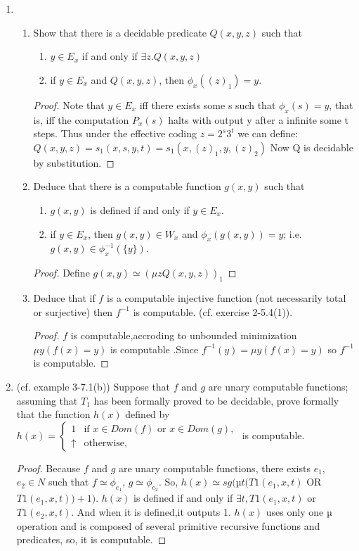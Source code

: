 \documentclass[12pt,a4paper]{article}
\theoremstyle{definition}
\numberwithin{equation}{section}
\numberwithin{figure}{section}
\begin{document}
\begin{enumerate}
\item
\begin{enumerate}
\item Show that there is a decidable predicate $Q(x,y,z)$ such that
\begin{enumerate}
\item $y\in E_x$ if and only if $\exists z.Q(x,y,z)$
\item if $y\in E_x$ and $Q(x,y,z)$, then $\phi_x((z)_1)=y$.
\end{enumerate}
\begin{proof}
Note that $y \in E_x$ iff there exists some s such that $\phi_x(s) = y$, that is, iff the computation $P_x(s)$ halts with output y after a infinite some t steps. Thus under the effective coding $z = 2^s3^t$ we can define: $Q(x,y,z)=s_1(x,s,y,t)=s_1(x,(z)_1,y,(z)_2)$
Now Q is decidable by substitution.
\end{proof}
\item Deduce that there is a computable function $g(x,y)$ such that
\begin{enumerate}
\item $g(x,y)$ is defined if and only if $y\in E_x$.
\item if $y\in E_x$, then $g(x,y)\in W_x$ and $\phi_x(g(x,y))=y$; i.e. $g(x,y)\in \phi^{-1}_x(\{y\})$.
\end{enumerate}
\begin{proof}
Define $g(x,y) \simeq (\mu zQ(x,y,z))_1 $
\end{proof}
\item Deduce that if $f$ is a computable injective function (not necessarily total or surjective) then $f^{-1}$ is computable. (cf. exercise 2-5.4(1)).
\begin{proof}
$f$ is computable,accroding to unbounded minimization $\mu y(f(x)=y)$ is computable .Since $f^{-1}(y) = \mu y(f(x)=y)$ so $f^{-1}$is computable.
\end{proof}
\end{enumerate}
\item (cf. example 3-7.1(b)) Suppose that $f$ and $g$ are unary computable functions; assuming that $T_1$ has been formally proved to be decidable, prove formally that the function $h(x)$ defined by \\
    $h(x)=\left\{\begin{array}{ll}
    1& \mbox{if } x\in Dom(f) \mbox{ or } x\in Dom(g),\\
    \uparrow & \mbox{otherwise},
    \end{array}\right.$ is computable.
\begin{proof}
Because $f$ and $g$ are unary computable functions, there exists $e_1$, $e_2 \in N$ such that $f \simeq \phi_{e_1}$, $g \simeq \phi_{e_2}$. So, $h(x) \simeq sg(µt(T1(e_1, x, t)$ OR $T1(e_1, x, t)) + 1)$. $h(x)$ is defined if and only
if $\exists t, T1(e_1, x, t)$ or $T1(e_2, x, t)$. And when it is defined,it outputs 1.
$h(x)$ uses only one $µ$ operation and is composed of several primitive recursive functions and predicates, so, it is computable.
\end{proof}


\end{enumerate}
\end{document}
